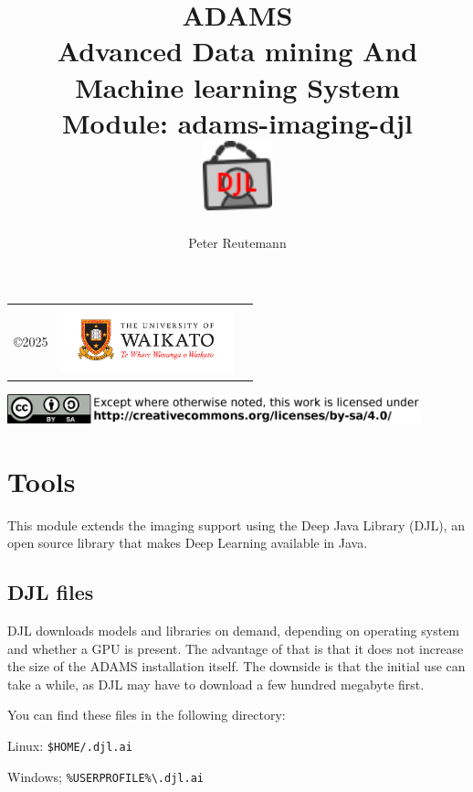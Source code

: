 \documentclass[a4paper]{book}
\title{
  \textbf{ADAMS} \\
  {\Large \textbf{A}dvanced \textbf{D}ata mining \textbf{A}nd \textbf{M}achine
  learning \textbf{S}ystem} \\
  {\Large Module: adams-imaging-djl} \\
  \vspace{1cm}
  \includegraphics[width=2cm]{images/imaging-djl-module.png} \\
}
\author{
  Peter Reutemann
}
\begin{document}
\begin{titlepage}
\maketitle

\thispagestyle{empty}
\center
\begin{table}[b]
	\begin{tabular}{c l l}
		\parbox[c][2cm]{2cm}{\copyright 2025} &
		\parbox[c][2cm]{5cm}{\includegraphics[width=5cm]{images/coat_of_arms.pdf}} \\
	\end{tabular}
	\includegraphics[width=12cm]{images/cc.png} \\
\end{table}

\end{titlepage}

\tableofcontents

\chapter{Tools}
This module extends the imaging support using the Deep Java Library\cite{djl} (DJL), an open source
library that makes Deep Learning available in Java.

\section{DJL files}
DJL downloads models and libraries on demand, depending on operating system and whether a GPU is present.
The advantage of that is that it does not increase the size of the ADAMS installation itself. The downside
is that the initial use can take a while, as DJL may have to download a few hundred megabyte first.

\noindent You can find these files in the following directory:
\begin{tight_itemize}
    \item Linux: \texttt{\$HOME/.djl.ai}
    \item Windows; \texttt{\%USERPROFILE\%\textbackslash.djl.ai}
\end{tight_itemize}
\end{document}
